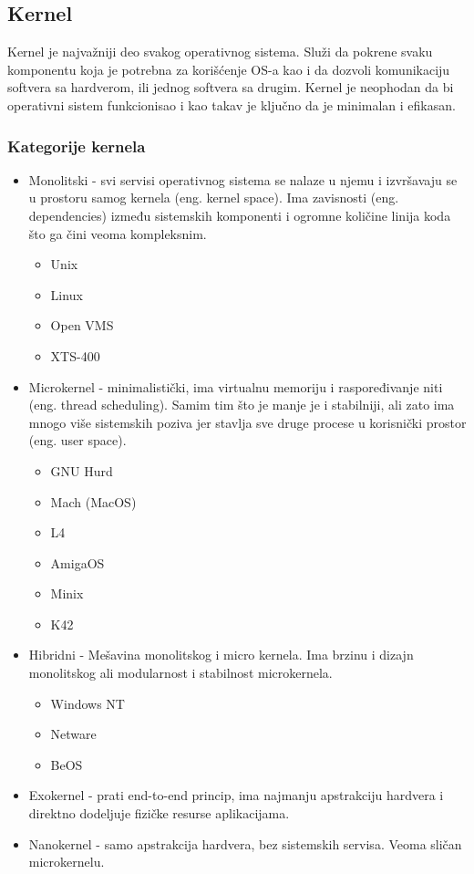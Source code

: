 \documentclass[a4paper,14pt]{article}
\begin{document}
\subsection{Kernel}
Kernel je najvažniji deo svakog operativnog sistema. Služi da pokrene svaku komponentu koja je potrebna za korišćenje OS-a kao i da dozvoli komunikaciju softvera sa hardverom, ili jednog softvera sa drugim. Kernel je neophodan da bi operativni sistem funkcionisao i kao takav je ključno da je minimalan i efikasan.

\subsubsection{Kategorije kernela}
\begin{itemize}
\item Monolitski - svi servisi operativnog sistema se nalaze u njemu i izvršavaju se u prostoru samog kernela (eng. kernel space). Ima zavisnosti (eng. dependencies) između sistemskih komponenti i ogromne količine linija koda što ga čini veoma kompleksnim.
\begin{itemize}
\item Unix
\item Linux
\item Open VMS
\item XTS-400
\end{itemize}
\item Microkernel - minimalistički, ima virtualnu memoriju i raspoređivanje niti (eng. thread scheduling). Samim tim što je manje je i stabilniji, ali zato ima mnogo više sistemskih poziva jer stavlja sve druge procese u korisnički prostor (eng. user space).
\begin{itemize}
\item GNU Hurd
\item Mach (MacOS)
\item L4
\item AmigaOS
\item Minix
\item K42
\end{itemize}
\item Hibridni - Mešavina monolitskog i micro kernela. Ima brzinu i dizajn monolitskog ali modularnost i stabilnost microkernela.
\begin{itemize}
\item Windows NT
\item Netware
\item BeOS
\end{itemize}
\item Exokernel - prati end-to-end princip, ima najmanju apstrakciju hardvera i direktno dodeljuje fizičke resurse aplikacijama.
\item Nanokernel - samo apstrakcija hardvera, bez sistemskih servisa. Veoma sličan microkernelu.
\end{itemize}
\newpage
\end{document}
